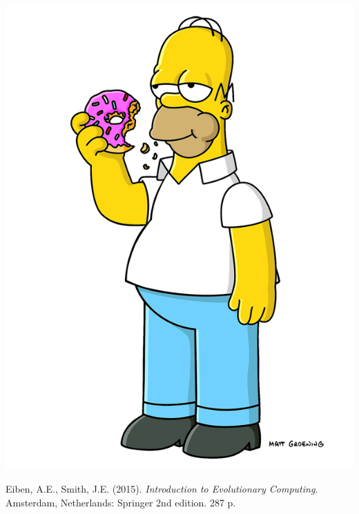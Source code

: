 \documentclass[10pt,letterpaper]{article}
\begin{document}
\begin{enumerate}
        \begin{center}\includegraphics[scale=0.1]{./assets/Homer.png}\end{center}
\end{enumerate}


\clearpage
\begin{thebibliography}{9}

      Eiben, A.E., Smith, J.E. (2015).
      \textit{Introduction to Evolutionary Computing}.
      Amsterdam, Netherlands: Springer 
      2nd edition. 287 p.
\end{thebibliography}
\end{document}
